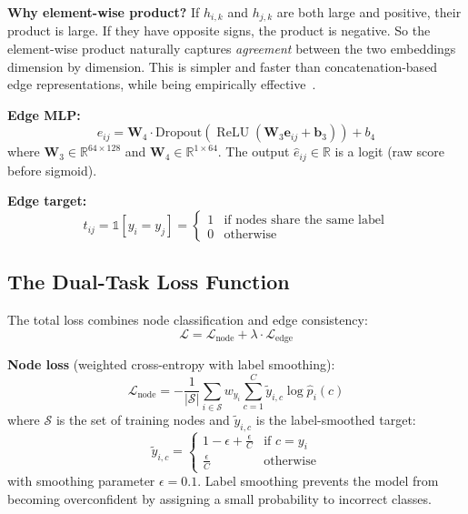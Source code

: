 \documentclass[conference]{IEEEtran}
\newcommand{\R}{\mathbb{R}}
\newcommand{\Loss}{\mathcal{L}}
\newcommand{\vect}[1]{\bm{#1}}
\newcommand{\mat}[1]{\mathbf{#1}}
\DeclareMathOperator{\ReLU}{ReLU}
\begin{document}
\textbf{Why element-wise product?} If $h_{i,k}$ and $h_{j,k}$ are both large and positive, their product is large. If they have opposite signs, the product is negative. So the element-wise product naturally captures \emph{agreement} between the two embeddings dimension by dimension. This is simpler and faster than concatenation-based edge representations, while being empirically effective~\cite{you2020graph}.

\textbf{Edge MLP:}
\begin{equation}
    \hat{e}_{ij} = \mat{W}_4 \cdot \text{Dropout}\!\left(\ReLU\!\left(\mat{W}_3 \vect{e}_{ij} + \vect{b}_3\right)\right) + b_4
\end{equation}
where $\mat{W}_3 \in \R^{64 \times 128}$ and $\mat{W}_4 \in \R^{1 \times 64}$. The output $\hat{e}_{ij} \in \R$ is a logit (raw score before sigmoid).

\textbf{Edge target:}
\begin{equation}
    t_{ij} = \mathbb{1}[y_i = y_j] = \begin{cases} 1 & \text{if nodes share the same label} \\ 0 & \text{otherwise} \end{cases}
\end{equation}

\subsection{The Dual-Task Loss Function}

The total loss combines node classification and edge consistency:
\begin{equation}
\boxed{\Loss = \Loss_{\text{node}} + \lambda \cdot \Loss_{\text{edge}}}
\end{equation}

\textbf{Node loss} (weighted cross-entropy with label smoothing):
\begin{equation}
    \Loss_{\text{node}} = -\frac{1}{|\mathcal{S}|} \sum_{i \in \mathcal{S}} w_{y_i} \sum_{c=1}^{C} \tilde{y}_{i,c} \log \hat{p}_i(c)
\end{equation}
where $\mathcal{S}$ is the set of training nodes and $\tilde{y}_{i,c}$ is the label-smoothed target:
\begin{equation}
    \tilde{y}_{i,c} = \begin{cases} 1 - \epsilon + \frac{\epsilon}{C} & \text{if } c = y_i \\ \frac{\epsilon}{C} & \text{otherwise} \end{cases}
\end{equation}
with smoothing parameter $\epsilon = 0.1$. Label smoothing prevents the model from becoming overconfident by assigning a small probability to incorrect classes.
\end{document}
